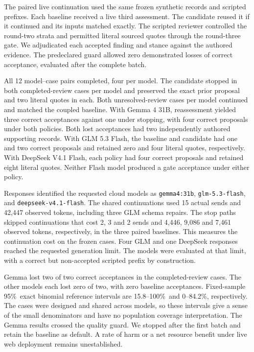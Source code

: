 \documentclass[conference]{IEEEtran}
\newcommand{\pct}{\%}
\begin{document}
The paired live continuation used the same frozen synthetic records and scripted prefixes. Each baseline received a live third assessment. The candidate reused it if it continued and its inputs matched exactly. The scripted reviewer controlled the round-two strata and permitted literal sourced quotes through the round-three gate. We adjudicated each accepted finding and stance against the authored evidence. The predeclared guard allowed zero demonstrated losses of correct acceptance, evaluated after the complete batch.

All 12 model--case pairs completed, four per model. The candidate stopped in both completed-review cases per model and preserved the exact prior proposal and two literal quotes in each. Both unresolved-review cases per model continued and matched the coupled baseline. With Gemma 4 31B, reassessment yielded three correct acceptances against one under stopping, with four correct proposals under both policies. Both lost acceptances had two independently authored supporting records. With GLM 5.3 Flash, the baseline and candidate had one and two correct proposals and retained zero and four literal quotes, respectively. With DeepSeek V4.1 Flash, each policy had four correct proposals and retained eight literal quotes. Neither Flash model produced a gate acceptance under either policy.

Responses identified the requested cloud models as \texttt{gemma4:31b}, \texttt{glm-5.3-flash}, and \texttt{deepseek-v4.1-flash}. The shared continuations used 15 actual sends and 42,447 observed tokens, including three GLM schema repairs. The stop paths skipped continuations that cost 2, 3 and 2 sends and 4,446, 9,086 and 7,461 observed tokens, respectively, in the three paired baselines. This measures the continuation cost on the frozen cases. Four GLM and one DeepSeek responses reached the requested generation limit. The models were evaluated at that limit, with a correct but non-accepted scripted prefix by construction.

Gemma lost two of two correct acceptances in the completed-review cases. The other models each lost zero of two, with zero baseline acceptances. Fixed-sample 95\pct\ exact binomial reference intervals are 15.8--100\pct\ and 0--84.2\pct, respectively. The cases were designed and shared across models, so these intervals give a sense of the small denominators and have no population coverage interpretation. The Gemma results crossed the quality guard. We stopped after the first batch and retain the baseline as default. A rate of harm or a net resource benefit under live web deployment remains unestablished.
\end{document}
